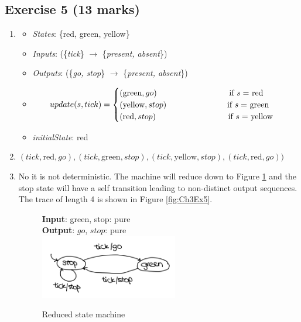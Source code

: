 \documentclass[11pt]{article}
\begin{document}
\subsection*{Exercise 5 (13 marks)}
\begin{enumerate}[label=\alph*)]
    \item %
    \begin{itemize}
        \item \textit{States}: \{red, green, yellow\}
        \item \textit{Inputs}: (\{\textit{tick}\} $\rightarrow$ \{\textit{present, absent}\})
        \item \textit{Outputs}: (\{\textit{go, stop}\} $\rightarrow$ \{\textit{present, absent}\})
        \item  
        $$update(s,tick) =  \begin{cases}
        (\text{green}, go) \hspace{3cm}\text{ if $s =$ red}\\
        (\text{yellow}, stop) \hspace{2.5cm}\text{ if $s =$ green}\\
        (\text{red}, stop) \hspace{3cm}\text{ if $s =$ yellow}
        \end{cases}$$
        \item \textit{initialState}: red
    \end{itemize}
    \item %
    $(tick, \text{red}, go),(tick, \text{green}, stop), (tick, \text{yellow}, stop), (tick, \text{red}, go))$
    \item %
    No it is not deterministic. The machine will reduce down to Figure \ref{fig:Ch3Ex5a} and the stop state will have a self transition leading to non-distinct output sequences. The trace of length 4 is shown in Figure \ref{fig:Ch3Ex5}. 
    \begin{figure}[H]
    \centering
    \textbf{Input}: green, stop: pure\\ 
    \textbf{Output}: $go$, $stop$: pure\\
    \includegraphics[width=6cm]{Ch3Ex5a.jpeg}
    \caption{Reduced state machine}
    \label{fig:Ch3Ex5a}

\end{figure}
\end{enumerate}
\end{document}
